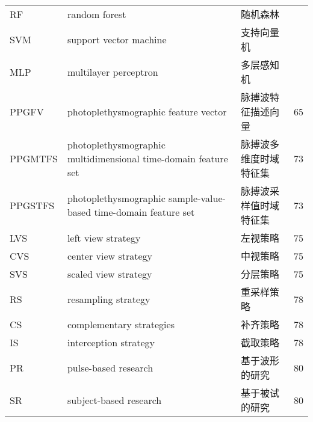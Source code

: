 \begin{center}
\begin{longtable}{m{2cm}m{7cm}m{5cm}m{1cm}<{\centering}}
        
        RF&random forest&随机森林\\
        SVM&support vector machine&支持向量机\\
        MLP&multilayer perceptron&多层感知机\\
        PPGFV &photoplethysmographic feature vector&  脉搏波特征描述向量 & 65\\
        PPGMTFS &     photoplethysmographic multidimensional time-domain feature set & 脉搏波多维度时域特征集 & 73 \\
        PPGSTFS &     photoplethysmographic sample-value-based time-domain feature set & 脉搏波采样值时域特征集 & 73 \\
        
        LVS & left view strategy & 左视策略 & 75 \\
        CVS & center view strategy & 中视策略 & 75 \\
        SVS & scaled view strategy & 分层策略 & 75 \\
        RS & resampling strategy & 重采样策略 & 78 \\
        CS & complementary strategies & 补齐策略 & 78 \\
        IS & interception strategy & 截取策略 & 78 \\
        PR & pulse-based research & 基于波形的研究 & 80 \\
        SR & subject-based research &基于被试的研究 & 80 \\


\end{longtable}
\end{center}
